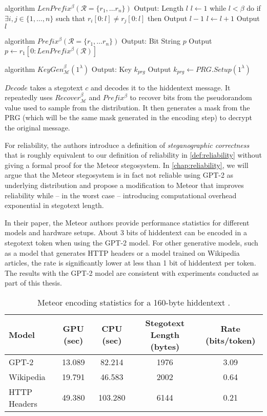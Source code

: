 \begin{Pseudocode}[caption={$LenPrefix$ algorithm \cite{Meteor2021}}]
algorithm $LenPrefix^\beta(\mathcal R = \{ r_1, \dots r_n \})$
  Output: Length $l$
  $l \leftarrow 1$
  while $l < \beta$ do
    if $\exists i, j \in \{ 1, \dots, n \}$ such that $r_i[0: l] \neq r_j[0:  l]$ then
      Output $l-1$
    $l \leftarrow l+1$
  Output $l$
\end{Pseudocode}%
%
\begin{Pseudocode}[caption={$Prefix$ algorithm \cite{Meteor2021}}]
algorithm $Prefix^\beta(  \mathcal R = \{ r_1, \dots r_n \})$
  Output: Bit String $p$
  Output $p \leftarrow r_1[0: LenPrefix^\beta(\mathcal{R})]$
\end{Pseudocode}%
%
\begin{Pseudocode}[caption={$KeyGen$ algorithm \cite{Meteor2021}}]
algorithm $KeyGen_{\mathcal{M}}^\beta(1^\lambda)$
  Output: Key $k_{prg}$
  Output $k_{prg} \leftarrow PRG.Setup(1^\lambda)$
\end{Pseudocode}

$Decode$ takes a stegotext $c$ and decodes it to the hiddentext message.
It repeatedly uses $Recover_{\mathcal{M}}^\beta$ and $Prefix^\beta$ to recover bits from the pseudorandom value used to sample from the distribution.
It then generates a mask from the PRG (which will be the same mask generated in the encoding step) to decrypt the original message.

For reliability, the authors introduce a definition of \emph{steganographic correctness} that is roughly equivalent to our definition of reliability in \autoref{def:reliability} without giving a formal proof for the Meteor stegosystem.
In \autoref{chap:reliability}, we will argue that the Meteor stegosystem is in fact not reliable using GPT-2 as underlying distribution and propose a modification to Meteor that improves reliability while -- in the worst case -- introducing computational overhead exponential in stegotext length.

In their paper, the Meteor authors provide performance statistics for different models and hardware setups.
About 3 bits of hiddentext can be encoded in a stegotext token when using the GPT-2 model.
For other generative models, such as a model that generates HTTP headers or a model trained on Wikipedia articles, the rate is significantly lower at less than 1 bit of hiddentext per token.
The results with the GPT-2 model are consistent with experiments conducted as part of this thesis.

\begin{table}[h!]
  \begin{tabular}{l||c|c|c|c}
    Model & GPU (sec) & CPU (sec) & Stegotext Length (bytes) & Rate (bits/token) \\
    \hline
    GPT-2        & 13.089 & 82.214  & 1976 & 3.09 \\
    Wikipedia    & 19.791 & 46.583  & 2002 & 0.64 \\
    HTTP Headers & 49.380 & 103.280 & 6144 & 0.21 \\
  \end{tabular}
  \caption{Meteor encoding statistics for a 160-byte hiddentext \cite{Meteor2021}.}
\end{table}

